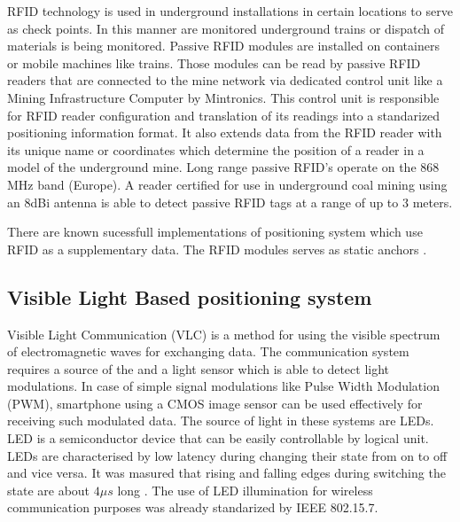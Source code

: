 \documentclass[../main.tex]{subfiles}
\begin{document}
RFID technology is used in underground installations in certain locations to serve as check points. In this manner are monitored underground trains or dispatch of materials is being monitored. Passive RFID modules are installed on containers or mobile machines like trains. Those modules can be read by passive RFID readers that are connected to the mine network via dedicated control unit like a Mining Infrastructure Computer by Mintronics\cite{Thesis_CM}. This control unit is responsible for RFID reader configuration and translation of its readings into a standarized positioning information format. It also extends data from the RFID reader with its unique name or coordinates which determine the position of a reader in a model of the underground mine. Long range passive RFID's operate on the 868 MHz band (Europe). A reader certified for use in underground coal mining using an 8dBi antenna is able to detect passive RFID tags at a range of up to 3 meters\cite{Thesis_CM}.

There are known sucessfull implementations of positioning system which use RFID as a supplementary data. The RFID modules serves as static anchors \cite{article_rfid_imu_safety_nav}\cite{thesis_smartphone_inertial_plus_rfid}.


\subsection{Visible Light Based positioning system} %
\label{sub:visible_light_based_positioning_system}


Visible Light Communication (VLC) is a method for using the visible spectrum of electromagnetic waves for exchanging data\cite{visible_light_positioning}. The communication system requires a source of the and a light sensor which is able to detect light modulations. In case of simple signal modulations like Pulse Width Modulation (PWM), smartphone using a CMOS image sensor can be used effectively for receiving such modulated data. The source of light in these systems are LEDs. LED is a semiconductor device that can be easily controllable by logical unit. LEDs are characterised by low latency during changing their state from on to off and vice versa. It was masured that rising and falling edges during switching the state are about $4 \mu s$ long \cite{visible_light_positioning_epsilon}. The use of LED illumination for wireless communication purposes was already standarized by IEEE 802.15.7.
\end{document}
